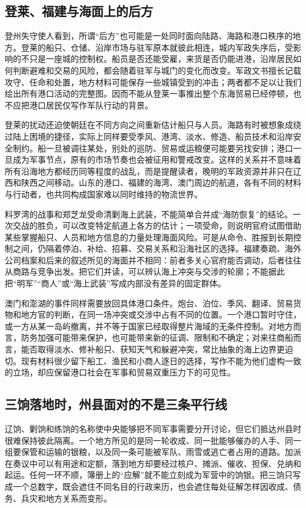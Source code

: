 \subsection{登莱、福建与海面上的后方}

登州失守使人看到，所谓“后方”也可能是一处同时面向陆路、海路和港口秩序的地方。登莱的船只、仓储、沿岸市场与驻军原本就彼此相连，城内军政失序后，受影响的不只是一座城的控制权。船员是否还能受雇，来货是否仍能进港，沿岸居民如何判断避难和交易的风险，都会随着驻军与城门的变化而改变。军政文书擅长记载攻守、任命和处置，地方材料可能保存一些城镇受到的冲击；两者都不足以让我们绘出所有港口活动的完整图。因而不能从登莱一事推出整个东海贸易已经停顿，也不应把港口居民仅写作军队行动的背景。

登莱的扰动还迫使朝廷在不同方向之间重新估计船只与人员。海路有时被想象成绕过陆上困境的捷径，实际上同样要受季风、港湾、淡水、修造、船员技术和沿岸安全制约。船一旦被调往某处，别处的巡防、贸易或运粮便可能要另找安排；港口一旦成为军事节点，原有的市场节奏也会被征用和警戒改变。这样的关系并不意味着所有沿海地方都经历同等程度的战乱，而是提醒读者，晚明的军政资源并非只在辽西和陕西之间移动。山东的港口、福建的海湾、澳门周边的航道，各有不同的材料与行动者，也共同构成国家难以同时维持的物流世界。

料罗湾的战事和郑芝龙受命清剿海上武装，不能简单合并成“海防恢复”的结论。一次交战的胜负，可以改变特定航道上各方的估计；一项受命，则说明官府试图借助某些掌握船只、人员和地方信息的力量处理海面风险。可是从命令、胜报到长期控制之间，仍隔着停泊、补给、招募、交易关系和沿海社区的选择。福建奏疏、海外公司档案和后来的叙述所见的海面并不相同：前者多关心官府能否调动，后者往往从商路与竞争出发。把它们并读，可以辨认海上冲突与交涉的轮廓；不能据此把“明军”“商人”或“海上武装”写成内部没有差异的固定群体。

澳门和澎湖的事件同样需要放回具体港口条件。炮台、泊位、季风、翻译、贸易货物和地方官的判断，在同一场冲突或交涉中占有不同的位置。一个港口暂时守住，或一方从某一岛屿撤离，并不等于国家已经取得整片海域的无条件控制。对地方而言，防务加强可能带来保护，也可能带来新的征调、限制和不确定；对来往商船而言，能否取得淡水、修补船只、获知天气和躲避冲突，常比抽象的海上边界更迫切。现有材料很少留下船工、渔民和小商人逐日的选择，写作不能为他们虚构一致的立场，却应保留港口社会在军事和贸易双重压力下的可见性。

\subsection{三饷落地时，州县面对的不是三条平行线}

辽饷、剿饷和练饷的名称使中央能够把不同军事需要分开讨论，但它们抵达州县时很难保持彼此隔离。一个地方所见的是同一轮收成、同一批能够催办的人手、同一组要保管和运输的银粮，以及同一条可能被军队、雨雪或逃亡者占用的道路。加派在奏议中可以有用途和定额，落到地方却要经过核户、摊派、催收、担保、兑纳和起运。任何一环不顺，簿册上的“应解”就不能立刻成为军营中的饷银。把三饷只写成一个总数字，既会遮住不同名目的行政来历，也会遮住每处征解怎样因收成、债务、兵灾和地方关系而变形。

